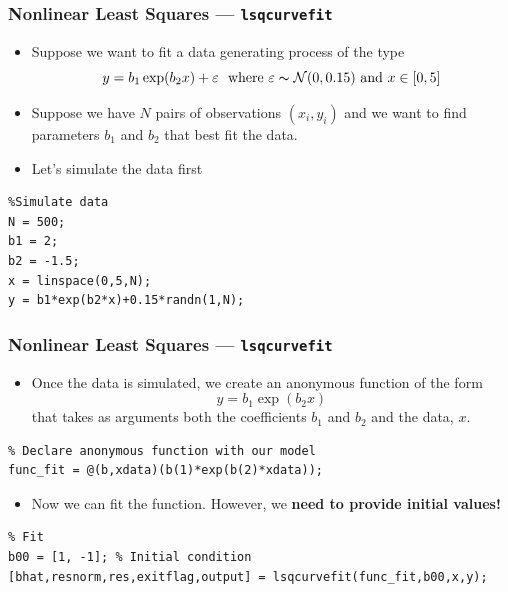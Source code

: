 \documentclass[11pt,xcolor={svgnames},aspectratio=169,usepdftitle=false]{beamer}
\begin{document}
\begin{frame}[fragile]
  \frametitle{Nonlinear Least Squares --- \texttt{lsqcurvefit}}
  \begin{itemize}
    \item Suppose we want to fit a data generating process of the type
    \[
    y = b_1 \exp(b_2 x) + \varepsilon \ \text{ where } \varepsilon \thicksim \mathcal{N}(0,0.15) \text{ and } x\in [0,5]
    \]
    \item Suppose we have $N$ pairs of observations $(x_i,y_i)$ and we want to find parameters $b_1$ and $b_2$ that best fit the data.
    \item Let's simulate the data first
  \end{itemize}
\begin{lstlisting}
%Simulate data
N = 500;
b1 = 2;
b2 = -1.5;
x = linspace(0,5,N);
y = b1*exp(b2*x)+0.15*randn(1,N);
\end{lstlisting}
\end{frame}

\begin{frame}[fragile]
  \frametitle{Nonlinear Least Squares --- \texttt{lsqcurvefit}}
\begin{itemize}
  \item Once the data is simulated, we create an anonymous function of the form
  \[
  y = b_1\exp(b_2 x)  
  \]
  that takes as arguments both the coefficients $b_1$ and $b_2$ and the data, $x$.
\end{itemize}
\begin{lstlisting}
% Declare anonymous function with our model
func_fit = @(b,xdata)(b(1)*exp(b(2)*xdata));
\end{lstlisting}
\begin{itemize}
  \item Now we can fit the function. However, we \alert{\textbf{need to provide initial values!}}
\end{itemize}
\begin{lstlisting}
% Fit
b00 = [1, -1]; % Initial condition
[bhat,resnorm,res,exitflag,output] = lsqcurvefit(func_fit,b00,x,y);
\end{lstlisting}
\end{frame}
\end{document}
